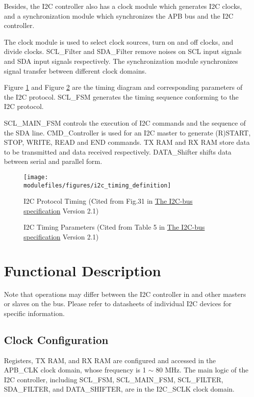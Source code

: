 \documentclass[main\_\_EN.tex]{subfiles}
\begin{document}
Besides, the I2C controller also has a clock module which generates I2C clocks, and a synchronization module which synchronizes the APB bus and the I2C controller.

The clock module is used to select clock sources, turn on and off clocks, and divide clocks. SCL\_Filter and SDA\_Filter remove noises on SCL input signals and SDA input signals respectively. The synchronization module synchronizes signal transfer between different clock domains.

Figure \ref{fig:i2c-protocol-timing} and Figure \ref{fig:i2c-timing-param} are the timing diagram and corresponding parameters of the I2C protocol. SCL\_FSM generates the timing sequence conforming to the I2C protocol.

SCL\_MAIN\_FSM controls the execution of I2C commands and the sequence of the SDA line. CMD\_Controller is used for an I2C master to generate (R)START, STOP, WRITE, READ and END commands. TX RAM and RX RAM store data to be transmitted and data received respectively. DATA\_Shifter shifts data between serial and parallel form.


\begin{figure}[H]
    \centering
    \texttt{[image: \\modulefiles/figures/i2c\_timing\_definition]}
    \caption{I2C Protocol Timing (Cited from Fig.31 in \href{https://www.csd.uoc.gr/~hy428/reading/i2c_spec.pdf}{The I2C-bus specification} Version 2.1)}
    \label{fig:i2c-protocol-timing}
\end{figure}

\begin{figure}[H]
    \centering
    \caption{I2C Timing Parameters (Cited from Table 5 in \href{https://www.csd.uoc.gr/~hy428/reading/i2c_spec.pdf}{The I2C-bus specification} Version 2.1)}
    \label{fig:i2c-timing-param}
\end{figure}


\section{Functional Description}
Note that operations may differ between the I2C controller in \chipname{} and other masters or slaves on the bus. Please refer to datasheets of individual I2C devices for specific information.

\subsection{Clock Configuration}
Registers, TX RAM, and RX RAM are configured and accessed in the APB\_CLK clock domain, whose frequency is 1 $\sim$ 80 MHz. The main logic of the I2C controller, including SCL\_FSM, SCL\_MAIN\_FSM, SCL\_FILTER, SDA\_FILTER, and DATA\_SHIFTER, are in the I2C\_SCLK clock domain.
\end{document}
